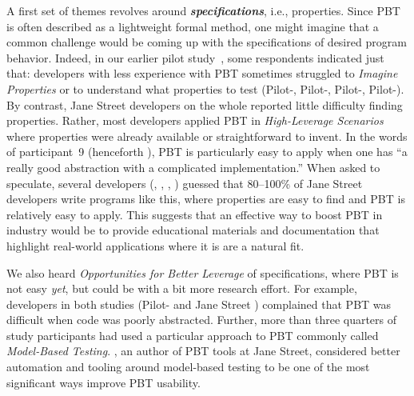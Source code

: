 \newcommand{\proptheme}[1]{{\color{nord-orange} \em #1}}
\newcommand{\gentheme}[1]{{\color{nord-green} \em #1}}
\newcommand{\evaltheme}[1]{{\color{nord-purple} \em #1}}
\newcommand{\edutheme}[1]{{\color{nord-frost4} \em #1}}
A first set of
themes revolves around \proptheme{\normalfont \bf specifications}, i.e.,
properties.
Since
PBT is often described as a lightweight formal method, one
might imagine that a common challenge would be coming up with the
specifications of desired program behavior. Indeed, in our earlier pilot
study~\cite{goldstein_problems_2022}, some respondents indicated just that:
developers with less experience with PBT
sometimes struggled to \proptheme{Imagine
Properties} or to understand what properties to test (Pilot-,
Pilot-,
Pilot-, Pilot-).
By contrast, Jane Street developers on the whole reported
little difficulty finding
properties. Rather, most developers applied PBT in
\proptheme{High-Leverage Scenarios} where properties were already
available or straightforward to invent. In the words of participant~9
(henceforth ), PBT is particularly easy to apply when
one has ``a really good abstraction with a complicated implementation.''
When asked to speculate, several developers (, ,
, ) guessed
that 80--100\% of Jane Street
developers write programs like this, where properties are easy to find and
PBT is relatively easy to apply. This suggests that an effective way to
boost PBT in industry would be to provide
educational materials and documentation that highlight
real-world applications where it is are a natural
fit. \iflater{}\fi

We also heard \proptheme{Opportunities for Better
Leverage} of specifications, where PBT is not easy {\em yet}, but
could be with a bit more research effort. For example, developers in
both studies (Pilot- and Jane Street ) complained
that PBT was difficult when code was poorly abstracted.  Further,
more than three
quarters of study participants had used a particular approach to PBT commonly
called \proptheme{Model-Based Testing}.  , an author of PBT tools
at Jane Street, considered better automation and tooling around model-based
testing to be one of the most significant ways improve PBT usability.

